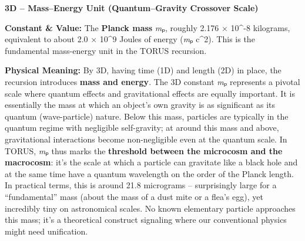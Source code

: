 \documentclass[
]{article}
\begin{document}
{\textbf{3D -- Mass--Energy Unit (Quantum--Gravity Crossover Scale)}

\textbf{Constant \& Value:} The \textbf{Planck mass} \emph{m}ₚ, roughly
2.176 × 10\^{}-8 kilograms\hspace{0pt}, equivalent to about 2.0 ×
10\^{}9 Joules of energy (\emph{m}ₚ c\^{}2). This is the fundamental
mass-energy unit in the TORUS recursion.

\textbf{Physical Meaning:} By 3D, having time (1D) and length (2D) in
place, the recursion introduces \textbf{mass and energy}. The 3D
constant \emph{m}ₚ represents a pivotal scale where quantum effects and
gravitational effects are equally important. It is essentially the mass
at which an object's own gravity is as significant as its quantum
(wave-particle) nature\hspace{0pt}. Below this mass, particles are
typically in the quantum regime with negligible self-gravity; at around
this mass and above, gravitational interactions become non-negligible
even at the quantum scale. In TORUS, \emph{m}ₚ thus marks the
\textbf{threshold between the microcosm and the macrocosm}\hspace{0pt}:
it's the scale at which a particle can gravitate like a black hole and
at the same time have a quantum wavelength on the order of the Planck
length. In practical terms, this is around 21.8 micrograms --
surprisingly large for a ``fundamental'' mass (about the mass of a dust
mite or a flea's egg), yet incredibly tiny on astronomical
scales\hspace{0pt}. No known elementary particle approaches this mass;
it's a theoretical construct signaling where our conventional physics
might need unification.

}
\end{document}
